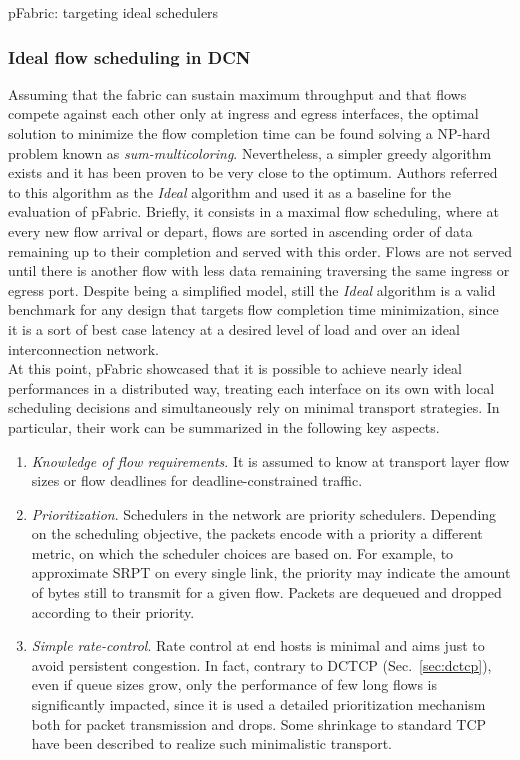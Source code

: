 \begin{subsection}{pFabric: targeting ideal schedulers}
\subsubsection{Ideal flow scheduling in DCN}
Assuming that the fabric can sustain maximum throughput and that flows compete against each other only at ingress and egress interfaces, the optimal solution to minimize the flow completion time can be found solving a NP-hard problem known as \textit{sum-multicoloring}. Nevertheless, a simpler greedy algorithm exists and it has been proven to be very close to the optimum. Authors referred to this algorithm as the \textit{Ideal} algorithm and used it as a baseline for the evaluation of pFabric.  Briefly, it consists in a maximal flow scheduling, where at every new flow arrival or depart, flows are sorted in ascending order of data remaining up to their completion and served with this order. Flows are not served until there is another flow with less data remaining traversing the same ingress or egress port. Despite being a simplified model, still the \textit{Ideal} algorithm is a valid benchmark for any design that targets flow completion time minimization, since it is a sort of best case latency at a desired level of load and over an ideal interconnection network. \\
At this point, pFabric showcased that it is possible to achieve nearly ideal performances in a distributed way, treating each interface on its own with local scheduling decisions and simultaneously rely on minimal transport strategies. In particular, their work can be summarized in the following key aspects. \\
\begin{enumerate}
	\item \textit{Knowledge of flow requirements}. It is assumed to know at transport layer flow sizes or flow deadlines for deadline-constrained traffic. 
	\item \textit{Prioritization}. Schedulers in the network are priority schedulers. Depending on the scheduling objective, the packets encode with a priority a different metric, on which the scheduler choices are based on. For example, to approximate SRPT on every single link, the priority may indicate the amount of bytes still to transmit for a given flow. Packets are dequeued and dropped according to their priority. 
	\item \textit{Simple rate-control}. Rate control at end hosts is minimal and aims just to avoid persistent congestion. In fact, contrary to DCTCP (Sec.~\ref{sec:dctcp}), even if queue sizes grow, only the performance of few long flows is significantly impacted, since it is used a detailed prioritization mechanism both for packet transmission and drops. Some shrinkage to standard TCP have been described to realize such minimalistic transport.
\end{enumerate}
 

\end{subsection}

